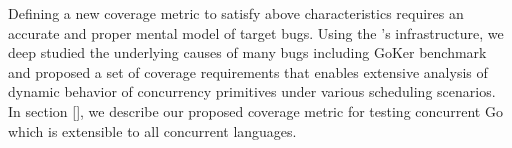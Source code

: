 Defining a new coverage metric to satisfy above characteristics requires an accurate and proper mental model of target bugs.
%
Using the \goat's infrastructure, we deep studied the underlying causes of many bugs including GoKer benchmark~\cite{yuan-gobench-cgo21} and proposed a set of coverage requirements that enables extensive analysis of dynamic behavior of concurrency primitives under various scheduling scenarios.
%
In section \ref{}, we describe our proposed coverage metric for testing concurrent Go which is extensible to all concurrent languages.
